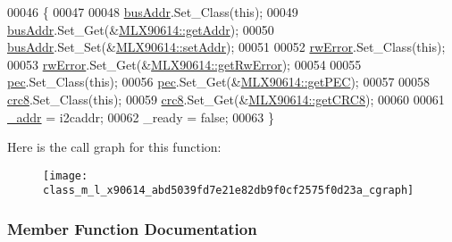 \begin{DoxyCode}
00046                                   \{
00047 
00048     \mbox{\hyperlink{class_m_l_x90614_a66d99dc5778b514038c0fa5e25a722f1}{busAddr}}.Set\_Class(\textcolor{keyword}{this});
00049     \mbox{\hyperlink{class_m_l_x90614_a66d99dc5778b514038c0fa5e25a722f1}{busAddr}}.Set\_Get(&\mbox{\hyperlink{class_m_l_x90614_a7ba22b140f92bea70381cf3c495d4c72}{MLX90614::getAddr}});
00050     \mbox{\hyperlink{class_m_l_x90614_a66d99dc5778b514038c0fa5e25a722f1}{busAddr}}.Set\_Set(&\mbox{\hyperlink{class_m_l_x90614_a3d8646faede1c0adc667c54a0c95a7db}{MLX90614::setAddr}});
00051 
00052     \mbox{\hyperlink{class_m_l_x90614_a13d10b57b4369c27e740585bf3907b0e}{rwError}}.Set\_Class(\textcolor{keyword}{this});
00053     \mbox{\hyperlink{class_m_l_x90614_a13d10b57b4369c27e740585bf3907b0e}{rwError}}.Set\_Get(&\mbox{\hyperlink{class_m_l_x90614_a785e254cb6af386a7f23ebd427b50c81}{MLX90614::getRwError}});
00054 
00055     \mbox{\hyperlink{class_m_l_x90614_af050e02eecd12a127a98fb2b30e40a88}{pec}}.Set\_Class(\textcolor{keyword}{this});
00056     \mbox{\hyperlink{class_m_l_x90614_af050e02eecd12a127a98fb2b30e40a88}{pec}}.Set\_Get(&\mbox{\hyperlink{class_m_l_x90614_a7bd321c53f70f4f3a96f7c6c7d4cb80e}{MLX90614::getPEC}});
00057 
00058     \mbox{\hyperlink{class_m_l_x90614_aa13abb960da5f7d8d0eb26df8632a679}{crc8}}.Set\_Class(\textcolor{keyword}{this});
00059     \mbox{\hyperlink{class_m_l_x90614_aa13abb960da5f7d8d0eb26df8632a679}{crc8}}.Set\_Get(&\mbox{\hyperlink{class_m_l_x90614_a6635121e11e44f85945d18bb81d85b4f}{MLX90614::getCRC8}});
00060 
00061     \mbox{\hyperlink{class_m_l_x90614_a768925264f76f33f9bf98aec1cbec6a9}{\_addr}} = i2caddr;
00062     \_ready = \textcolor{keyword}{false};
00063 \}
\end{DoxyCode}
Here is the call graph for this function\+:\nopagebreak
\begin{figure}[H]
\begin{center}
\leavevmode
\texttt{[image: class\_m\_l\_x90614\_abd5039fd7e21e82db9f0cf2575f0d23a\_cgraph]}
\end{center}
\end{figure}


\subsubsection{Member Function Documentation}
\mbox{\label{class_m_l_x90614_a2a5b34da155086b85fb74ceb7310b2cb}} 
